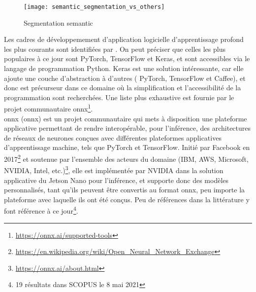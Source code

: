 \begin{figure}[H]
   \centering
   \texttt{[image: semantic\_segmentation\_vs\_others]}
   \caption[Segmentation semantic]{Segmentation semantic\parencite[p.~1]{wu_recent_2019}}
   \label{fig:semantic_segmentation_vs_others}
\end{figure}
\noindent Les cadres de développemement d'application logicielle d'apprentissage profond les plus courants sont identifiées par \parencite{cornioley_integration_2018}. On peut préciser que celles les plus populaires à ce jour sont PyTorch, TensorFlow et Keras, et sont accessibles via le langage de programmation Python. Keras est une solution intéressante, car elle ajoute une couche d'abstraction à d'autres ( PyTorch, TensorFlow et Caffee), et donc est précurseur dans ce domaine où la simplification et l'accessibilité de la programmation sont recherchées. Une liste plus exhaustive est fournie par le projet communautaire \acrshort{onnx}\footnote{\url{https://onnx.ai/supported-tools}}.
\vspace{\baselineskip}
\\
\noindent \acrshort{onnx} (\acrlong{onnx}) est un projet communautaire qui mets à disposition une plateforme applicative permettant de rendre interopérable, pour l'inférence, des architectures de réseaux de neurones conçues avec différentes plateformes applicatives d'apprentissage machine, tels que PyTorch et TensorFlow. Initié par Facebook en 2017\footnote{\url{https://en.wikipedia.org/wiki/Open_Neural_Network_Exchange}} et soutenue par l'ensemble des acteurs du domaine (IBM, AWS, Microsoft, NVIDIA, Intel, etc.)\footnote{\url{https://onnx.ai/about.html}}, elle est implémentée par NVIDIA dans la solution applicative du Jetson Nano pour l'inférence, et supporte donc des modèles personnalisés, tant qu'ils peuvent être convertis au format \acrshort{onnx}, peu importe la plateforme avec laquelle ils ont été conçus. Peu de références dans la littérature y font référence à ce jour\footnote{19 résultats dans SCOPUS le 8 mai 2021}.